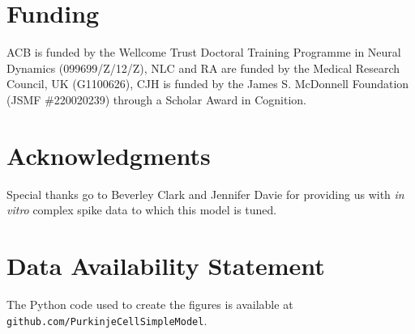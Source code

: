\documentclass[utf8]{frontiersSCNS} %
\begin{document}
\section*{Funding}
ACB is funded by the Wellcome Trust Doctoral Training Programme
in Neural Dynamics (099699/Z/12/Z), NLC and RA are funded by the
Medical Research Council, UK (G1100626), CJH is funded by the James
S. McDonnell Foundation (JSMF \#220020239) through a Scholar Award in
Cognition.

\section*{Acknowledgments}
Special thanks go to Beverley Clark and Jennifer Davie for providing
us with \textit{in vitro} complex spike data to which this model is
tuned.


\section*{Data Availability Statement}
 The Python code used to create the figures is available at \texttt{github.com/PurkinjeCellSimpleModel}.


\end{document}
